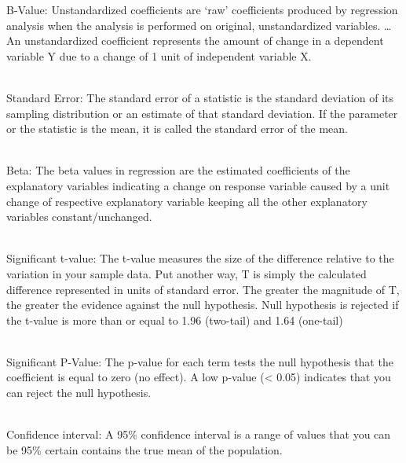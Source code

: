 \documentclass[
  letterpaper,
  DIV=11,
  numbers=noendperiod]{scrreprt}
\begin{document}
\begin{tcolorbox}[enhanced jigsaw, rightrule=.15mm, arc=.35mm, colframe=quarto-callout-note-color-frame, coltitle=black, left=2mm, colbacktitle=quarto-callout-note-color!10!white, bottomtitle=1mm, titlerule=0mm, colback=white, breakable, opacitybacktitle=0.6, opacityback=0, toprule=.15mm, toptitle=1mm, title=\textcolor{quarto-callout-note-color}{\faInfo}\hspace{0.5em}{Results Interpretation}, bottomrule=.15mm, leftrule=.75mm]

{B-Value:} {Unstandardized coefficients are `raw' coefficients produced
by regression analysis when the analysis is performed on original,
unstandardized variables. \ldots{} An unstandardized coefficient
represents the amount of change in a dependent variable Y due to a
change of 1 unit of independent variable X.}\\
\strut \\
{Standard Error:} The standard error of a statistic is the standard
deviation of its sampling distribution or an estimate of that standard
deviation. If the parameter or the statistic is the mean, it is called
the standard error of the mean.\\
\strut \\
{Beta:} {The beta values in regression are the estimated coefficients of
the explanatory variables indicating a change on response variable
caused by a unit change of respective explanatory variable keeping all
the other explanatory variables constant/unchanged.}\\
\strut \\
{Significant t-value:} {The t-value measures the size of the difference
relative to the variation in your sample data. Put another way, T is
simply the calculated difference represented in units of standard error.
The greater the magnitude of T, the greater the evidence against the
null hypothesis.} {Null hypothesis is rejected if the t-value is more
than or equal to 1.96 (two-tail) and 1.64 (one-tail)}\\
\strut \\
{Significant P-Value:} {The p-value for each term tests the null
hypothesis that the coefficient is equal to zero (no effect).} {A low
p-value (\textless{} 0.05) indicates that you can reject the null
hypothesis.}\\
\strut \\
{Confidence interval:} {A 95\% confidence interval is a range of values
that you can be 95\% certain contains the true mean of the
population.}\\

\end{tcolorbox}
\end{document}
